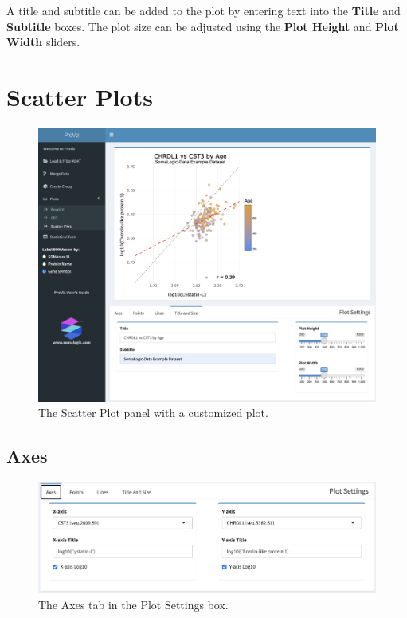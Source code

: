 \documentclass[
]{book}
\begin{document}
A title and subtitle can be added to the plot by entering text into the \textbf{Title} and \textbf{Subtitle} boxes. The plot size can be adjusted using the \textbf{Plot Height} and \textbf{Plot Width} sliders.

\hypertarget{scatter-plots}{%
\section{Scatter Plots}\label{scatter-plots}}

\begin{figure}
\centering
\includegraphics{images/Scatter_Panel.png}
\caption{The Scatter Plot panel with a customized plot.}
\end{figure}

\hypertarget{axes-2}{%
\subsection{Axes}\label{axes-2}}

\begin{figure}
\centering
\includegraphics{images/Scatter_Axes.png}
\caption{The Axes tab in the Plot Settings box.}
\end{figure}
\end{document}
